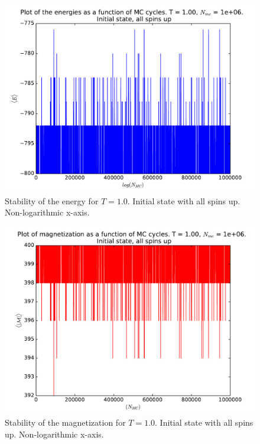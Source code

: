 \documentclass[12pt]{article}
\begin{document}
\begin{figure}[H]
\centering
\includegraphics[width=\linewidth]{Plots/Energy_stability_UpInitSpin_T1.pdf}
\caption{Stability of the energy for $T = 1.0$. Initial state with all spins up. Non-logarithmic x-axis.}
\end{figure}

\begin{figure}[H]
\centering
\includegraphics[width=\linewidth]{Plots/Magnetization_stability_UpInitSpin_T1.pdf}
\caption{Stability of the magnetization for $T=1.0$. Initial state with all spins up. Non-logarithmic x-axis.}
\end{figure}
\end{document}
